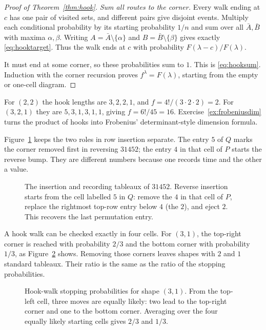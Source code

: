 \begin{proof}[Proof of Theorem~\ref{thm:hook}]
\emph{Sum all routes to the corner.}
Every walk ending at $c$ has one pair of visited sets, and different pairs give disjoint events. Multiply each conditional probability by its starting probability $1/n$ and sum over all $\bar A,\bar B$ with maxima $\alpha,\beta$. Writing
$A=\bar A\setminus\{\alpha\}$ and $B=\bar B\setminus\{\beta\}$ gives exactly \eqref{eq:hooktarget}. Thus the walk ends at $c$ with probability $F(\lambda-c)/F(\lambda)$.

It must end at some corner, so these probabilities sum to $1$. This is \eqref{eq:hooksum}. Induction with the corner recursion proves $f^\lambda=F(\lambda)$, starting from the empty or one-cell diagram.
\end{proof}

For $(2,2)$ the hook lengths are $3,2,2,1$, and $f=4!/(3\cdot2\cdot2)=2$. For $(3,2,1)$ they are $5,3,1,3,1,1$, giving $f=6!/45=16$. Exercise~\ref{ex:frobeniusdim} turns the product of hooks into Frobenius' determinant-style dimension formula.

Figure~\ref{fig:v10new-ch10-insertion} keeps the two roles in row insertion separate. The entry $5$ of $Q$ marks the corner removed first in reversing $31452$; the entry $4$ in that cell of $P$ starts the reverse bump. They are different numbers because one records time and the other a value.

\begin{figure}[ht]
\centering
{}
\caption{The insertion and recording tableaux of $31452$. Reverse insertion starts from the cell labelled $5$ in $Q$: remove the $4$ in that cell of $P$, replace the rightmost top-row entry below $4$ (the $2$), and eject $2$. This recovers the last permutation entry.}
\label{fig:v10new-ch10-insertion}
\end{figure}

A hook walk can be checked exactly in four cells. For $(3,1)$, the top-right corner is reached with probability $2/3$ and the bottom corner with probability $1/3$, as Figure~\ref{fig:v10new-ch10-hookprob} shows. Removing those corners leaves shapes with $2$ and $1$ standard tableaux. Their ratio is the same as the ratio of the stopping probabilities.

\begin{figure}[ht]
\centering
{}
\caption{Hook-walk stopping probabilities for shape $(3,1)$. From the top-left cell, three moves are equally likely: two lead to the top-right corner and one to the bottom corner. Averaging over the four equally likely starting cells gives $2/3$ and $1/3$.}
\label{fig:v10new-ch10-hookprob}
\end{figure}


